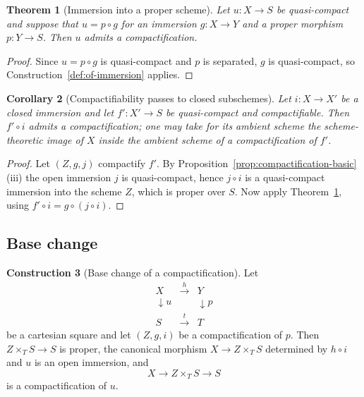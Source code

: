 \documentclass[11pt,a4paper]{article}
\theoremstyle{plain}
\newtheorem{theorem}{Theorem}[section]
\newtheorem{corollary}[theorem]{Corollary}
\theoremstyle{definition}
\newtheorem{construction}[theorem]{Construction}
\theoremstyle{remark}
\begin{document}
\begin{theorem}[Immersion into a proper scheme]
\label{thm:immersion-into-proper}
Let $u\colon X\to S$ be quasi-compact and suppose that $u=p\circ g$ for an
immersion $g\colon X\to Y$ and a proper morphism $p\colon Y\to S$. Then $u$
admits a compactification.
\end{theorem}

\begin{proof}
Since $u=p\circ g$ is quasi-compact and $p$ is separated, $g$ is
quasi-compact, so Construction~\ref{def:of-immersion} applies.
\end{proof}

\begin{corollary}[Compactifiability passes to closed subschemes]
\label{cor:closed-subscheme}
Let $i\colon X\to X'$ be a closed immersion and let $f'\colon X'\to S$ be
quasi-compact and compactifiable. Then $f'\circ i$ admits a compactification;
one may take for its ambient scheme the scheme-theoretic image of $X$ inside
the ambient scheme of a compactification of $f'$.
\end{corollary}

\begin{proof}
Let $(Z,g,j)$ compactify $f'$. By
Proposition~\ref{prop:compactification-basic}(iii) the open immersion $j$ is
quasi-compact, hence $j\circ i$ is a quasi-compact immersion into the scheme
$Z$, which is proper over $S$. Now apply
Theorem~\ref{thm:immersion-into-proper}, using $f'\circ i=g\circ(j\circ i)$.
\end{proof}

\subsection{Base change}

\begin{construction}[Base change of a compactification]
\label{def:compactification-base-change}
Let
\[
\begin{array}{ccc}
X & \xrightarrow{\;h\;} & Y\\
\downarrow{\scriptstyle u} & & \downarrow{\scriptstyle p}\\
S & \xrightarrow{\;t\;} & T
\end{array}
\]
be a cartesian square and let $(Z,g,i)$ be a compactification of $p$. Then
$Z\times_T S\to S$ is proper, the canonical morphism $X\to Z\times_T S$
determined by $h\circ i$ and $u$ is an open immersion, and
\[
  X \longrightarrow Z\times_T S \longrightarrow S
\]
is a compactification of $u$.
\end{construction}
\end{document}
